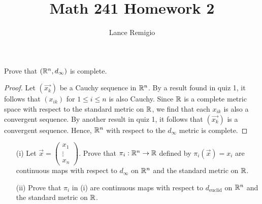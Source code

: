 \documentclass[a4paper]{article}
\title{Math 241 Homework 2}
\author{Lance Remigio}
\begin{document}
\begin{problem}
    Prove that \( (\mathbb{R}^{n}, {d}_{\infty }) \) is complete.
\end{problem}
\begin{proof}
Let \( (\vec{ {x}_{k} } ) \) be a Cauchy sequence in \( \mathbb{R}^{n} \). By a result found in quiz 1, it follows that \( ({x}_{ik}) \) for \( 1 \leq i \leq n  \) is also Cauchy. Since \( \mathbb{R}  \) is a complete metric space with respect to the standard metric on \( \mathbb{R}  \), we find that each \( {x}_{ik } \) is also a convergent sequence. By another result in quiz 1, it follows that \( (\vec{ {x}_{k} } ) \) is a convergent sequence. Hence, \( \mathbb{R}^{n} \) with respect to the \( {d}_{\infty } \) metric is complete.
\end{proof}

\begin{problem}
    \begin{enumerate}
        \item[(i)] Let \( \vec{x} = \displaystyle \begin{pmatrix} {x}_{1} \\ \vdots \\ {x}_{n}  \end{pmatrix}  \). Prove that \( {\pi}_{i}: \mathbb{R}^{n} \to \mathbb{R}  \) defined by
            \(  {\pi}_{i}(\vec{ x } ) = {x}_{i} \)
            are continuous maps with respect to \( {d}_{\infty }  \) on \( \mathbb{R}^{n}  \) and the standard metric on \( \mathbb{R}  \).
        \item[(ii)] Prove that \( {\pi}_{i} \) in (i) are continuous maps with respect to \( {d}_{\text{euclid}} \) on \( \mathbb{R}^{n} \) and the standard metric on \( \mathbb{R}  \).
    \end{enumerate}
\end{problem}
\end{document}
